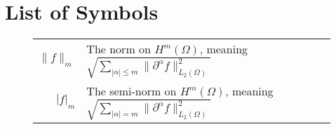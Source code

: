 \section*{List of Symbols}
\begin{center}
\begin{figure}[ht!]
\setlength{\extrarowheight}{10pt}
\begin{tabularx}{\textwidth}{rX}
$\|f\|_m$ & The norm on $H^m(\Omega)$, meaning $\sqrt{\sum_{|\alpha|\leq m}\|\partial ^\alpha f\|_{L_2(\Omega)}^2}$ \\
$|f|_m$ & The semi-norm on $H^m(\Omega)$, meaning $\sqrt{\sum_{|\alpha|= m}\|\partial ^\alpha f\|_{L_2(\Omega)}^2}$ \\
\end{tabularx}
\end{figure}
\end{center}
\vfill
